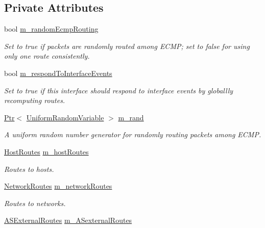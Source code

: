 \subsection*{Private Attributes}
\begin{DoxyCompactItemize}
\item 
bool \hyperlink{classns3_1_1Ipv4GlobalRouting_aecf81bc1f0bdbb4fff3fa7c56e4707a4}{m\+\_\+random\+Ecmp\+Routing}
\begin{DoxyCompactList}\small\item\em Set to true if packets are randomly routed among E\+C\+MP; set to false for using only one route consistently. \end{DoxyCompactList}\item 
bool \hyperlink{classns3_1_1Ipv4GlobalRouting_ae346dbd5b2a06c03df13c1a3987e4719}{m\+\_\+respond\+To\+Interface\+Events}
\begin{DoxyCompactList}\small\item\em Set to true if this interface should respond to interface events by globallly recomputing routes. \end{DoxyCompactList}\item 
\hyperlink{classns3_1_1Ptr}{Ptr}$<$ \hyperlink{classns3_1_1UniformRandomVariable}{Uniform\+Random\+Variable} $>$ \hyperlink{classns3_1_1Ipv4GlobalRouting_a3cc74017538737dc3f6ec7f511a3481e}{m\+\_\+rand}
\begin{DoxyCompactList}\small\item\em A uniform random number generator for randomly routing packets among E\+C\+MP. \end{DoxyCompactList}\item 
\hyperlink{classns3_1_1Ipv4GlobalRouting_a08b1b12aa1fb8d95b67cefc785f0a235}{Host\+Routes} \hyperlink{classns3_1_1Ipv4GlobalRouting_adcef09fc8af430a93c9437edfc22511c}{m\+\_\+host\+Routes}
\begin{DoxyCompactList}\small\item\em Routes to hosts. \end{DoxyCompactList}\item 
\hyperlink{classns3_1_1Ipv4GlobalRouting_ab63c3f6778a619bb464078d9ee0112e9}{Network\+Routes} \hyperlink{classns3_1_1Ipv4GlobalRouting_aef3903663955f6f9a411be06752f3976}{m\+\_\+network\+Routes}
\begin{DoxyCompactList}\small\item\em Routes to networks. \end{DoxyCompactList}\item 
\hyperlink{classns3_1_1Ipv4GlobalRouting_a1227a5732cb954fe1a2255b7799ba296}{A\+S\+External\+Routes} \hyperlink{classns3_1_1Ipv4GlobalRouting_ad34f23b0d519a9603b6d9225185fc5ad}{m\+\_\+\+A\+Sexternal\+Routes}

\end{DoxyCompactItemize}
